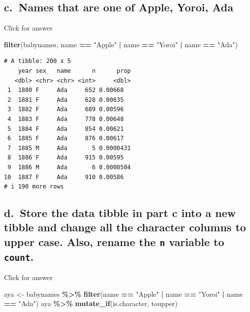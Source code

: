 \documentclass[
]{book}
\newenvironment{Shaded}{\begin{snugshade}}{\end{snugshade}}
\newcommand{\FunctionTok}[1]{\textcolor[rgb]{0.13,0.29,0.53}{\textbf{#1}}}
\newcommand{\NormalTok}[1]{#1}
\newcommand{\OtherTok}[1]{\textcolor[rgb]{0.56,0.35,0.01}{#1}}
\newcommand{\SpecialCharTok}[1]{\textcolor[rgb]{0.81,0.36,0.00}{\textbf{#1}}}
\newcommand{\StringTok}[1]{\textcolor[rgb]{0.31,0.60,0.02}{#1}}
\begin{document}
\hypertarget{c.-names-that-are-one-of-apple-yoroi-ada}{%
\subsection{c.~Names that are one of Apple, Yoroi, Ada}\label{c.-names-that-are-one-of-apple-yoroi-ada}}

Click for answer

\begin{Shaded}
\begin{Highlighting}[]
\FunctionTok{filter}\NormalTok{(babynames, name }\SpecialCharTok{==} \StringTok{"Apple"} \SpecialCharTok{|}\NormalTok{ name }\SpecialCharTok{==} \StringTok{"Yoroi"} \SpecialCharTok{|}\NormalTok{ name }\SpecialCharTok{==} \StringTok{"Ada"}\NormalTok{)}
\end{Highlighting}
\end{Shaded}

\begin{verbatim}
# A tibble: 200 x 5
    year sex   name      n      prop
   <dbl> <chr> <chr> <int>     <dbl>
 1  1880 F     Ada     652 0.00668  
 2  1881 F     Ada     628 0.00635  
 3  1882 F     Ada     689 0.00596  
 4  1883 F     Ada     778 0.00648  
 5  1884 F     Ada     854 0.00621  
 6  1885 F     Ada     876 0.00617  
 7  1885 M     Ada       5 0.0000431
 8  1886 F     Ada     915 0.00595  
 9  1886 M     Ada       6 0.0000504
10  1887 F     Ada     910 0.00586  
# i 190 more rows
\end{verbatim}

\hypertarget{d.-store-the-data-tibble-in-part-c-into-a-new-tibble-and-change-all-the-character-columns-to-upper-case.-also-rename-the-n-variable-to-count.}{%
\subsection{\texorpdfstring{d.~Store the data tibble in part c into a new tibble and change all the character columns to upper case. Also, rename the \texttt{n} variable to \texttt{count}.}{d.~Store the data tibble in part c into a new tibble and change all the character columns to upper case. Also, rename the n variable to count.}}\label{d.-store-the-data-tibble-in-part-c-into-a-new-tibble-and-change-all-the-character-columns-to-upper-case.-also-rename-the-n-variable-to-count.}}

Click for answer

\begin{Shaded}
\begin{Highlighting}[]
\NormalTok{aya }\OtherTok{\textless{}{-}}\NormalTok{ babynames }\SpecialCharTok{\%\textgreater{}\%} \FunctionTok{filter}\NormalTok{(name }\SpecialCharTok{==} \StringTok{"Apple"} \SpecialCharTok{|}\NormalTok{ name }\SpecialCharTok{==} \StringTok{"Yoroi"} \SpecialCharTok{|}\NormalTok{ name }\SpecialCharTok{==} \StringTok{"Ada"}\NormalTok{)}
\NormalTok{aya }\SpecialCharTok{\%\textgreater{}\%} \FunctionTok{mutate\_if}\NormalTok{(is.character, toupper)}
\end{Highlighting}
\end{Shaded}
\end{document}
